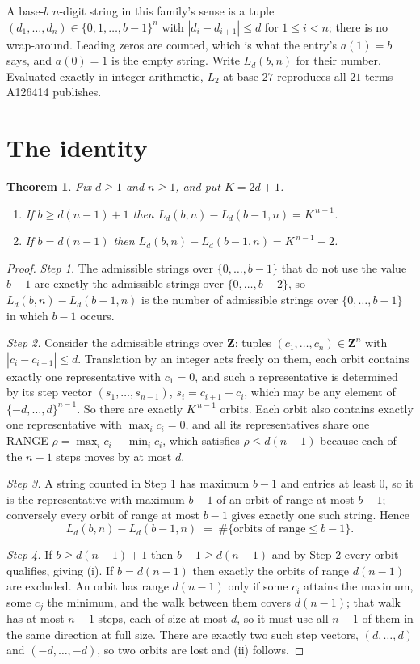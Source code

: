 \documentclass[11pt,a4paper]{article}
\theoremstyle{plain}
\newtheorem{theorem}{Theorem}
\theoremstyle{definition}
\begin{document}
A base-$b$ $n$-digit string in this family's sense is a tuple
$(d_1,\dots,d_n)\in\{0,1,\dots,b-1\}^{n}$ with $|d_i-d_{i+1}|\le d$ for $1\le i<n$; there
is no wrap-around. Leading zeros are counted, which is what the entry's $a(1)=b$ says, and
$a(0)=1$ is the empty string. Write $L_d(b,n)$ for their number. Evaluated exactly in integer
arithmetic, $L_{2}$ at base $27$ reproduces all $21$ terms A126414 publishes.

\section{The identity}

\begin{theorem}
Fix $d\ge1$ and $n\ge1$, and put $K=2d+1$.
\begin{enumerate}
\item[(i)] If $b\ge d(n-1)+1$ then $L_d(b,n)-L_d(b-1,n)=K^{\,n-1}$.
\item[(ii)] If $b=d(n-1)$ then $L_d(b,n)-L_d(b-1,n)=K^{\,n-1}-2$.
\end{enumerate}
\end{theorem}

\begin{proof}
\emph{Step 1.} The admissible strings over $\{0,\dots,b-1\}$ that do not use the value $b-1$
are exactly the admissible strings over $\{0,\dots,b-2\}$, so $L_d(b,n)-L_d(b-1,n)$ is the
number of admissible strings over $\{0,\dots,b-1\}$ in which $b-1$ occurs.

\emph{Step 2.} Consider the admissible strings over $\mathbf{Z}$: tuples
$(c_1,\dots,c_n)\in\mathbf{Z}^{n}$ with $|c_i-c_{i+1}|\le d$. Translation by an integer acts
freely on them, each orbit contains exactly one representative with $c_1=0$, and such a
representative is determined by its step vector $(s_1,\dots,s_{n-1})$, $s_i=c_{i+1}-c_i$,
which may be any element of $\{-d,\dots,d\}^{n-1}$. So there are exactly $K^{\,n-1}$ orbits.
Each orbit also contains exactly one representative with $\max_i c_i=0$, and all its
representatives share one RANGE $\rho=\max_ic_i-\min_ic_i$, which satisfies
$\rho\le d(n-1)$ because each of the $n-1$ steps moves by at most $d$.

\emph{Step 3.} A string counted in Step 1 has maximum $b-1$ and entries at least $0$, so it is
the representative with maximum $b-1$ of an orbit of range at most $b-1$; conversely every orbit
of range at most $b-1$ gives exactly one such string. Hence
\[
L_d(b,n)-L_d(b-1,n)\;=\;\#\{\text{orbits of range}\le b-1\} .
\]

\emph{Step 4.} If $b\ge d(n-1)+1$ then $b-1\ge d(n-1)$ and by Step 2 every orbit qualifies,
giving (i). If $b=d(n-1)$ then exactly the orbits of range $d(n-1)$ are excluded. An orbit has
range $d(n-1)$ only if some $c_i$ attains the maximum, some $c_j$ the minimum, and the walk
between them covers $d(n-1)$; that walk has at most $n-1$ steps, each of size at most $d$, so it
must use all $n-1$ of them in the same direction at full size. There are exactly two such step
vectors, $(d,\dots,d)$ and $(-d,\dots,-d)$, so two orbits are lost and (ii) follows.
\end{proof}
\end{document}
